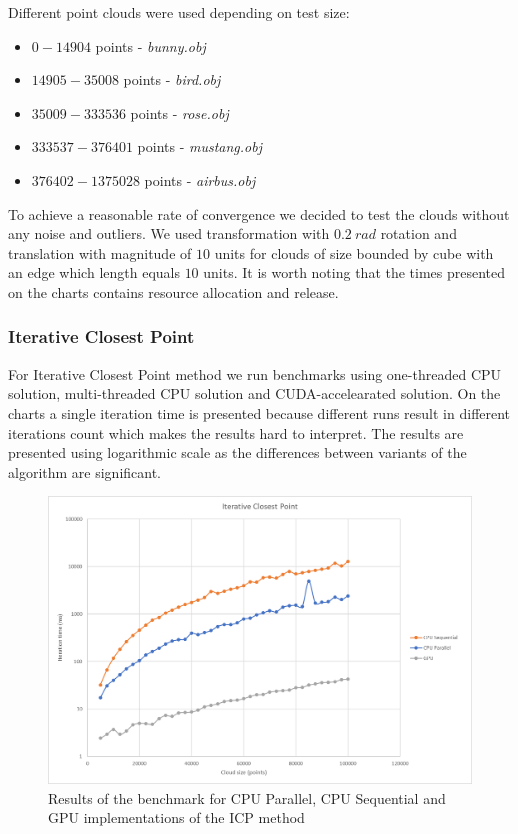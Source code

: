 \documentclass[titlepage]{article}
\begin{document}
Different point clouds were used depending on test size:
\begin{itemize}
\item $0 - 14904$ points - \textit{bunny.obj}
\item $14905 - 35008$ points - \textit{bird.obj}
\item $35009 - 333536$ points - \textit{rose.obj}
\item $333537 - 376401$ points - \textit{mustang.obj}
\item $376402 - 1375028$ points - \textit{airbus.obj}
\end{itemize}

To achieve a reasonable rate of convergence we decided to test the clouds without any noise and outliers. We used transformation with $0.2\: rad$ rotation and translation with magnitude of $10$ units for clouds of size bounded by cube with an edge which length equals $10$ units. It is worth noting that the times presented on the charts contains resource allocation and release.

\subsubsection{Iterative Closest Point}
For Iterative Closest Point method we run benchmarks using one-threaded CPU solution, multi-threaded CPU solution and CUDA-accelearated solution. On the charts a single iteration time is presented because different runs result in different iterations count which makes the results hard to interpret. The results are presented using logarithmic scale as the differences between variants of the algorithm are significant.

\begin{figure}[H]
\includegraphics[width=\textwidth]{ms-icp-1.png}
\caption{Results of the benchmark for CPU Parallel, CPU Sequential and GPU implementations of the ICP method}
\end{figure} 
\end{document}
